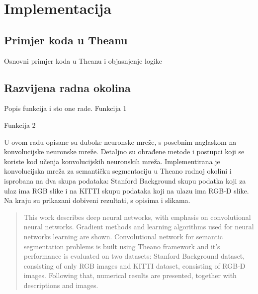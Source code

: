 \documentclass[times, utf8, diplomski, numeric]{fer}
\begin{document}
\chapter{Implementacija}
\section{Primjer koda u Theanu}

Osnovni primjer koda u Theanu i objasnjenje logike

\section{Razvijena radna okolina}

Popis funkcija i sto one rade.
Funkcija 1

Funkcija 2


\begin{sazetak}
U ovom radu opisane su duboke neuronske mreže, s posebnim naglaskom na konvolucijske neuronske mreže. Detaljno su obrađene metode i postupci koji se koriste kod učenja konvolucijskih neuronskih mreža. Implementirana je konvolucijska mreža za semantičku segmentaciju u Theano radnoj okolini i isprobana na dva skupa podataka: Stanford Background skupu podatka koji za ulaz ima RGB slike i na KITTI skupu podataka koji na ulazu ima RGB-D slike. Na kraju su prikazani dobiveni rezultati, s opisima i slikama.

\end{sazetak}

\begin{abstract}
This work describes deep neural networks, with emphasis on convolutional neural networks. Gradient methods and learning algorithms used for neural networks learning are shown. Convolutional network for semantic segmentation problems is built using Theano framework and it's performance is evaluated on two datasets: Stanford Background dataset, consisting of only RGB images and KITTI dataset, consisting of RGB-D images. Following that, numerical results are presented, together with descriptions and images.

\end{abstract}
\end{document}
